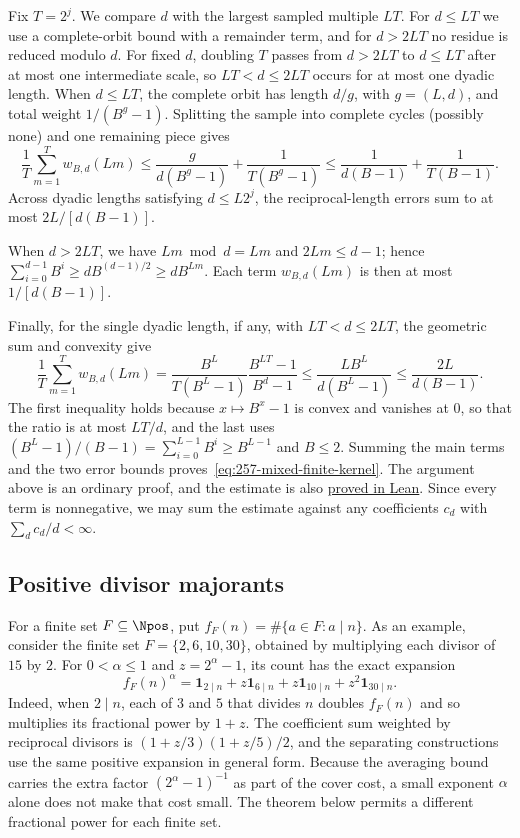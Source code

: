Fix $T=2^j$. We compare $d$ with the largest sampled multiple $LT$.
For $d\le LT$ we use a complete-orbit bound with a remainder term, and
for $d>2LT$ no residue is reduced modulo $d$. For fixed $d$, doubling
$T$ passes from $d>2LT$ to $d\le LT$ after at most one intermediate
scale, so $LT<d\le2LT$ occurs for at most one dyadic length.
When $d\le LT$, the complete orbit has length $d/g$, with $g=(L,d)$,
and total weight $1/(B^g-1)$. Splitting the sample into complete
cycles (possibly none) and one remaining piece gives
\[
 \frac1T\sum_{m=1}^T w_{B,d}(Lm)
 \le\frac{g}{d(B^g-1)}+\frac1{T(B^g-1)}
 \le\frac1{d(B-1)}+\frac1{T(B-1)}.
\]
Across dyadic lengths satisfying $d\le L2^j$, the reciprocal-length
errors sum to at most $2L/[d(B-1)]$.
\par
\begin{samepage}
\noindent
When $d>2LT$, we have $Lm\bmod d=Lm$ and $2Lm\le d-1$; hence
$\sum_{i=0}^{d-1}B^i\ge dB^{(d-1)/2}\ge dB^{Lm}$.
Each term $w_{B,d}(Lm)$ is then at most $1/[d(B-1)]$.
\par
\end{samepage}
Finally, for the single dyadic length, if any, with $LT<d\le2LT$, the
geometric sum and convexity give
\[
 \frac1T\sum_{m=1}^T w_{B,d}(Lm)
 =\frac{B^L}{T(B^L-1)}\frac{B^{LT}-1}{B^d-1}
 \le\frac{LB^L}{d(B^L-1)}
 \le\frac{2L}{d(B-1)}.
\]
The first inequality holds because $x\mapsto B^x-1$ is convex and
vanishes at $0$, so that the ratio is at most $LT/d$, and the last uses
$(B^L-1)/(B-1)=\sum_{i=0}^{L-1}B^i\ge B^{L-1}$ and $B\le2$.
Summing the main terms and the two error bounds proves~\eqref{eq:257-mixed-finite-kernel}.
The argument above is an ordinary proof, and the estimate is also
\href{https://github.com/wcook04/plectis-erdos/blob/c91562bd574a387cde904481e609c7b4cacebb14/lean/ErdosProblems/Erdos257/PaperCompleteR8/DyadicKernel.lean\#L206}{proved in Lean}.
Since every term is nonnegative, we may sum the estimate against any
coefficients $c_d$ with $\sum_dc_d/d<\infty$.

\subsection{Positive divisor majorants}
For a finite set $F\subseteq\Npos$, put
$f_F(n)=\#\{a\in F:a\mid n\}$. As an example, consider the finite set
$F=\{2,6,10,30\}$, obtained by multiplying each divisor of $15$ by $2$.
For $0<\alpha\le1$
and $z=2^\alpha-1$, its count has the exact expansion
\[
 f_F(n)^\alpha
 =\mathbf1_{2\mid n}+z\mathbf1_{6\mid n}
  +z\mathbf1_{10\mid n}+z^2\mathbf1_{30\mid n}.
\]
Indeed, when $2\mid n$, each of $3$ and $5$ that divides $n$ doubles
$f_F(n)$ and so multiplies its fractional power by $1+z$. The
coefficient sum weighted by reciprocal divisors is $(1+z/3)(1+z/5)/2$,
and the separating constructions use the same positive expansion in
general form. Because the averaging bound carries the extra factor
$(2^\alpha-1)^{-1}$ as part of the cover cost, a small exponent $\alpha$
alone does not make that cost small. The theorem below permits a
different fractional power for each finite set.

